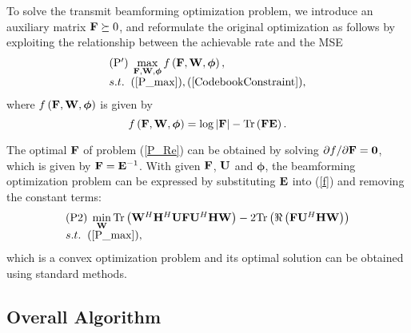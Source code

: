 \documentclass[lettersize, journal]{IEEEtran}
\begin{document}
To solve the transmit beamforming optimization problem, we introduce an auxiliary matrix ${\bf{F}} \succeq 0$, and reformulate the original optimization as follows by exploiting the relationship between the achievable rate and the MSE {\cite{TSP.2011.2147784}}
\begin{equation}\label{P_Re}
\begin{array}{l}
({\rm{P'}})\; \max \limits_{ {\bf{F}}, \bf{W}, {\bm{\phi }} } f \left( {\bf{F}}, {\bf{W}}, {\bm{\phi }} \right),  \\
s.t. \;\; (\ref{P_max}), (\ref{CodebookConstraint}),
\end{array}
\end{equation}
where $f \left( {\bf{F}}, {\bf{W}}, {\bm{\phi }} \right)$ is given by
\begin{equation}\label{f}
f \left( {\bf{F}}, {\bf{W}}, {\bm{\phi }} \right) = \log\left|{\bf{F}} \right| - {\rm{Tr}}\left( {\bf{F}}{\bf{E}} \right).
\end{equation}

The optimal ${\bf{F}}$ of problem (\ref{P_Re}) can be obtained by solving ${\partial f}/{\partial {\bf{F}}} = {\bf{0}}$, which is given by ${\bf{F}} = {\bf{E}}^{-1}$.
With given ${\bf{F}}$, ${\bf{U}}$ and ${\bm{\phi }}$, the beamforming optimization problem can be expressed by substituting ${\bf{E}}$ into (\ref{f}) and removing the constant terms:
\begin{equation}\label{P_W}
\begin{array}{l}
({\rm{P2}})\;  \min \limits_{ \bf{W} }   {\rm{Tr}}\left( {\bf{W}}^H {\bf{H}}^H {\bf{U}} {\bf{F}} {\bf{U}}^H {\bf{H}} {\bf{W}}  \right) -2  {\rm{Tr}}\left(\Re \left( {\bf{F}} {\bf{U}}^H {\bf{H}} {\bf{W}} \right) \right)   \\
s.t. \;\; (\ref{P_max}),
\end{array}
\end{equation}
which is a convex optimization problem and its optimal solution can be obtained using standard methods.


\subsection{Overall Algorithm}  
\end{document}
